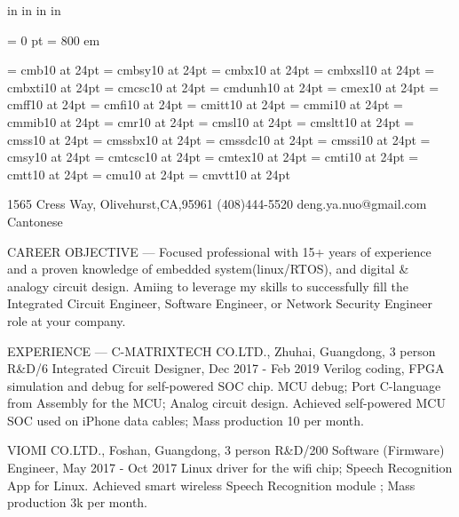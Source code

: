 \nopagenumbers

 in     %
 in    %
 in  %
 in  %

\parindent = 0 pt
\emergencystretch = 800 em


\font\FFcmb=      cmb10            at 24pt
\font\FFcmbsy=    cmbsy10          at 24pt
\font\FFcmbx=     cmbx10           at 24pt
\font\FFcmbxsl=   cmbxsl10         at 24pt
\font\FFcmbxti=   cmbxti10         at 24pt
\font\FFcmcsc=    cmcsc10          at 24pt
\font\FFcmdunh=   cmdunh10         at 24pt
\font\FFcmex=     cmex10           at 24pt
\font\FFcmff=     cmff10           at 24pt
\font\FFcmfi=     cmfi10           at 24pt
\font\FFcmitt=    cmitt10          at 24pt
\font\FFcmmi=     cmmi10           at 24pt
\font\FFcmmib=    cmmib10          at 24pt
\font\FFcmr=      cmr10            at 24pt
\font\FFcmsl=     cmsl10           at 24pt
\font\FFcmsltt=   cmsltt10         at 24pt
\font\FFcmss=     cmss10           at 24pt
\font\FFcmssbx=   cmssbx10         at 24pt
\font\FFcmssdc=   cmssdc10         at 24pt
\font\FFcmssi=    cmssi10          at 24pt
\font\FFcmsy=     cmsy10           at 24pt
\font\FFcmtcsc=   cmtcsc10         at 24pt
\font\FFcmtex=    cmtex10          at 24pt
\font\FFcmti=     cmti10           at 24pt
\font\FFcmtt=     cmtt10           at 24pt
\font\FFcmu=      cmu10            at 24pt
\font\FFcmvtt=    cmvtt10          at 24pt


\centerline{ \FFcmb
}

1565 Cress Way, Olivehurst,CA,95961
(408)444-5520
deng.ya.nuo@gmail.com
Cantonese

CAREER OBJECTIVE
---
Focused professional with 15+ years of experience and a proven knowledge of embedded system(linux/RTOS), and digital \& analogy circuit design. Amiing to leverage my skills to successfully fill the Integrated Circuit Engineer, Software Engineer, or Network Security Engineer role at your company.

EXPERIENCE
---
C-MATRIXTECH CO.LTD., Zhuhai, Guangdong, 3 person R\&D/6
Integrated Circuit Designer, Dec 2017 - Feb 2019
 Verilog coding, FPGA simulation and debug for self-powered SOC chip. 
 MCU debug; Port C-language from Assembly for the MCU; Analog circuit design.
 Achieved self-powered MCU SOC used on iPhone data cables; Mass production 10 per month.

VIOMI CO.LTD., Foshan, Guangdong, 3 person R\&D/200
Software (Firmware) Engineer, May 2017 - Oct 2017
 Linux driver for the wifi chip; Speech Recognition App for Linux.
 Achieved smart wireless Speech Recognition module ; Mass production 3k per month.

